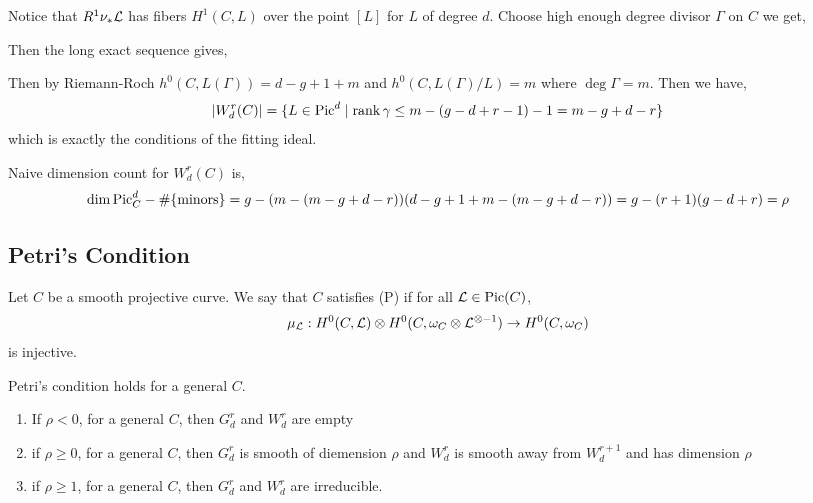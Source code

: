 \documentclass[12pt]{article}
\begin{document}
\begin{rmk}
Notice that $R^1 \nu_* \mathcal{L}$ has fibers $H^1(C, L)$ over the point $[L]$ for $L$ of degree $d$. Choose high enough degree divisor $\Gamma$ on $C$ we get,
\begin{center}
\end{center}
Then the long exact sequence gives,
\begin{center}
\end{center}
Then by Riemann-Roch $h^0(C, L(\Gamma)) = d - g + 1 + m$ and $h^0(C, L(\Gamma)/L) = m$ where $\deg{\Gamma} = m$.
Then we have,
\[ |W^r_d(C)| = \{ L \in \mathrm{Pic}^d \mid \operatorname{\mathrm{rank}} \gamma \le m - (g - d + r - 1) - 1 = m - g + d - r \} \]
which is exactly the conditions of the fitting ideal. 
\end{rmk}

\begin{rmk}
Naive dimension count for $W^r_d(C)$ is,
\[ \dim{\mathrm{Pic}_C^d} - \# \{ \text{minors} \} = g - (m - (m - g + d - r))(d - g + 1 + m - (m - g + d - r)) = g - (r+1)(g-d+r) = \rho \] 
\end{rmk}

\subsection{Petri's Condition}

Let $C$ be a smooth projective curve. We say that $C$ satisfies (P) if for all $\mathcal{L} \in \mathrm{Pic}{(C)}$,
\[ \mu_{\mathcal{L}} : H^0(C, \mathcal{L}) \otimes H^0(C, \omega_C \otimes \mathcal{L}^{\otimes -1}) \to H^0(C, \omega_C) \]
is injective. 

\begin{theorem}[Gieseker]
Petri's condition holds for a general $C$. 
\end{theorem}

\begin{cor}
\begin{enumerate}
\item If $\rho < 0$, for a general $C$, then $G^r_d$ and $W^r_d$ are empty
\item if $\rho \ge 0$, for a general $C$, then $G^r_d$ is smooth of diemension $\rho$ and $W^r_d$ is smooth away from $W^{r+1}_d$ and has dimension $\rho$
\item if $\rho \ge 1$, for a general $C$, then $G^r_d$ and $W^r_d$ are irreducible. 
\end{enumerate}
\end{cor}
\end{document}
